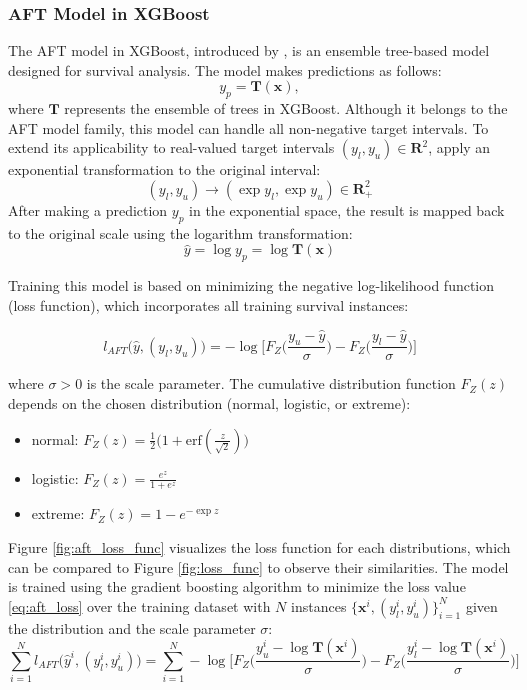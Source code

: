 \documentclass[12pt]{article}
\begin{document}
\subsubsection{AFT Model in XGBoost}
The AFT model in XGBoost, introduced by \citet{aft_xgboost}, is an ensemble tree-based model designed for survival analysis. 
The model makes predictions as follows:  
\[
y_p = \mathbf{T}(\mathbf{x}),
\]
where $\mathbf{T}$ represents the ensemble of trees in XGBoost.
Although it belongs to the AFT model family, this model can handle all non-negative target intervals.
To extend its applicability to real-valued target intervals $(y_l, y_u) \in \mathbf{R}^2$, \citet{aft_xgboost} apply an exponential transformation to the original interval:  
\[
(y_l, y_u) \longrightarrow (\exp y_l, \exp y_u) \in \mathbf{R}_{+}^2
\]
After making a prediction $y_p$ in the exponential space, the result is mapped back to the original scale using the logarithm transformation:
\[
\hat{y} = \log y_p = \log \mathbf{T}(\mathbf{x})
\]

Training this model is based on minimizing the negative log-likelihood function (loss function), which incorporates all training survival instances:

\begin{equation}
    l_{AFT}\Big(\hat{y}, (y_l, y_u)\Big) = -\log \Big[ F_Z\big( \frac{y_u - \hat{y}}{\sigma} \big) - F_Z\big(\frac{y_l - \hat{y}}{\sigma}\big) \Big]
\end{equation}



\noindent where $\sigma > 0$ is the scale parameter.
The cumulative distribution function $F_Z(z)$ depends on the chosen distribution (normal, logistic, or extreme):
\begin{itemize}
    \item normal: \phantom{00}   $F_Z(z) = \frac{1}{2}\big( 1 + \text{erf}(\frac{z}{\sqrt{2}}) \big)$
    \item logistic: \phantom{00} $F_Z(z) = \frac{e^z}{1+e^z}$
    \item extreme: \phantom{0} $F_Z(z) = 1 - e^{-\exp z}$
\end{itemize}

Figure \ref{fig:aft_loss_func} visualizes the loss function for each distributions, which can be compared to Figure \ref{fig:loss_func} to observe their similarities. 
The model is trained using the gradient boosting algorithm \citep{gradient_boosting} to minimize the loss value \eqref{eq:aft_loss} over the training dataset with $N$ instances $\{\mathbf{x}^i, (y_l^i, y_u^i)\}_{i=1}^N$ given the distribution and the scale parameter $\sigma$:
\begin{equation*}
    \sum_{i = 1}^N l_{AFT}\Big(\hat{y}^i, (y_l^i, y_u^i)\Big) = \sum_{i=1}^N -\log \Big[ F_Z\big( \frac{y_u^i - \log\mathbf{T}(\mathbf{x}^i)}{\sigma} \big) - F_Z\big(\frac{y_l^i - \log\mathbf{T}(\mathbf{x}^i)}{\sigma}\big) \Big]
\end{equation*}
\end{document}
